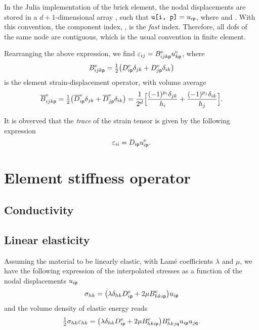 \begin{remark}
  In the Julia implementation of the brick element, the nodal displacements are
  stored in a \(d+1\)-dimensional array , such that
  \(\text{\texttt{u[i, p]}}=u_{i\mathsf{p}}\), where  and
  . With this convention, the
  component index, , is the \emph{fast} index. Therefore, all dofs of
  the same node are contiguous, which is the usual convention in finite element.
\end{remark}

Rearranging the above expression, we find
\(\varepsilon_{ij}=B^{\mathrm{e}}_{ijk\mathsf{p}}u_{k\mathsf{p}}^{\mathrm{e}}\), where
\begin{equation}
  B_{ijk\mathsf{p}}^{\mathrm{e}}
  =\tfrac12\bigl(D^{\mathrm{e}}_{i\mathsf{p}}\delta_{jk}
  +D^{\mathrm{e}}_{j\mathsf{p}}\delta_{ik}\bigr)
\end{equation}
is the element strain-displacement operator, with volume average
\begin{equation}
  \overline{B}_{ijk\mathsf{p}}^{\mathrm{e}}
  =\tfrac12\bigl(\overline{D}^{\mathrm{e}}_{i\mathsf{p}}\delta_{jk}
  +\overline{D}^{\mathrm{e}}_{j\mathsf{p}}\delta_{ik}\bigr)
  =\frac1{2^d}\Bigl[\frac{(-1)^{p_i}\delta_{jk}}{h_i}
  +\frac{(-1)^{p_j}\delta_{ik}}{h_j}\Bigr].
\end{equation}

It is obverved that the \emph{trace} of the strain tensor is given by the
following expression
\begin{equation}
  \varepsilon_{ii}=D_{i\mathsf{p}}u_{i\mathsf{p}}^{\mathrm{e}}.
\end{equation}

\section{Element stiffness operator}

\subsection{Conductivity}

\subsection{Linear elasticity}

Assuming the material to be linearly elastic, with Lamé coefficients \(\lambda\)
and \(\mu\), we have the following expression of the interpolated stresses as a
function of the nodal displacements \(u_{i\mathsf{p}}\)
\begin{equation}
  \sigma_{hk}=\bigl(\lambda\delta_{hk} D^{\mathrm{e}}_{i\mathsf{p}}
  +2\mu B^{\mathrm{e}}_{hki\mathsf{p}}\bigr)u_{i\mathsf{p}}
\end{equation}
and the volume density of elastic energy reads
\begin{equation}
  \tfrac12\sigma_{hk}\varepsilon_{hk}
  =\bigl(\lambda\delta_{hk} D^{\mathrm{e}}_{i\mathsf{p}}
  +2\mu B^{\mathrm{e}}_{hki\mathsf{p}}\bigr)B_{hkj\mathsf{q}}^{\mathrm{e}}
  u_{i\mathsf{p}}u_{j\mathsf{q}}.
\end{equation}

